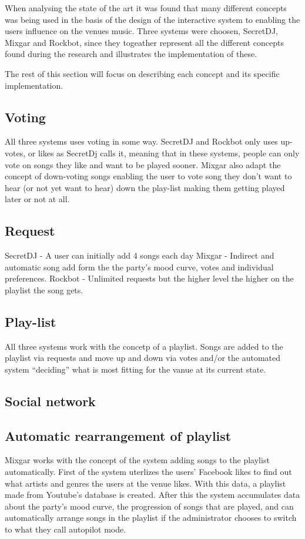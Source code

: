 When analysing the state of the art it was found that many different concepts was being used in the basis of the design of the interactive system to enabling the users influence on the venues music. Three systems were choosen, SecretDJ, Mixgar and Rockbot, since they togeather represent all the different concepts found during the research and illustrates the implementation of these.

The rest of this section will focus on describing each concept and its specific implementation.

\subsection{Voting}
All three systems uses voting in some way. SecretDJ and Rockbot only uses up-votes, or likes as SecretDj calls it, meaning that in these systems, people can only vote on songs they like and want to be played sooner. Mixgar also adapt the concept of down-voting songs enabling the user to vote song they don't want to hear (or not yet want to hear) down the play-list making them getting played later or not at all.

\subsection{Request}
SecretDJ - A user can initially add 4 songs each day
Mixgar - Indirect and automatic song add form the the party's mood curve, votes and individual preferences.
Rockbot - Unlimited requests but the higher level the higher on the playlist the song gets.

\subsection{Play-list}
All three systems work with the concetp of a playlist. Songs are added to the playlist via requests and move up and down via votes and/or the automated system \enquote{deciding} what is most fitting for the vanue at its current state.

\subsection{Social network}


\subsection{Automatic rearrangement of playlist}
Mixgar works with the concept of the system adding songs to the playlist automatically. First of the system uterlizes the users’ Facebook likes to find out what artists and genres the users at the venue likes. With this data, a playlist made from Youtube’s database is created. After this the system accumulates data about the party’s mood curve, the progression of songs that are played, and can automatically arrange songs in the playlist if the
administrator chooses to switch to what they call autopilot mode.

